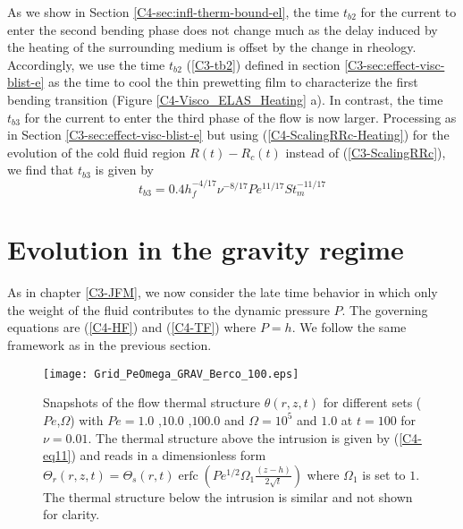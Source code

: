 As  we  show  in Section  \ref{C4-sec:infl-therm-bound-el},  the  time
$t_{b2}$ for  the current to enter  the second bending phase  does not
change much  as the delay  induced by  the heating of  the surrounding
medium is offset  by the change in rheology.  Accordingly,  we use the
time      $t_{b2}$     (\ref{C3-tb2})      defined     in      section
\ref{C3-sec:effect-visc-blist-e}  as   the  time  to  cool   the  thin
prewetting film  to characterize the first  bending transition (Figure
\ref{C4-Visco_ELAS_Heating} a). In contrast, the time $t_{b3}$ for the
current to enter the third phase of the flow is now larger. Processing
as    in    Section   \ref{C3-sec:effect-visc-blist-e}    but    using
(\ref{C4-ScalingRRc-Heating})  for the  evolution  of  the cold  fluid
region $R(t)-R_c(t)$  instead of  (\ref{C3-ScalingRRc}), we  find that
$t_{b3}$ is given by
\begin{equation}
  t_{b3}=0.4h_f^{-4/17}\nu^{-8/17}Pe^{11/17}St_m^{-11/17}
  \label{C4-tb3}
\end{equation}

\section{Evolution in the gravity regime}
\label{C4-sec:evol-grav-regime}

As in chapter \ref{C3-JFM}, we now  consider the late time behavior in
which only the weight of the fluid contributes to the dynamic pressure
$P$. The governing equations are (\ref{C4-HF}) and (\ref{C4-TF}) where
$P=h$. We follow the same framework as in the previous section.

\begin{figure}[h!]
  \begin{center}
    \graphicspath{ {/Users/thorey/Documents/These/Projet/Refroidissement/Skin_Model/Figure/Figure_Heating/} }
    \texttt{[image: Grid\_PeOmega\_GRAV\_Berco\_100.eps]}
    \caption{Snapshots of  the flow thermal  structure $\theta(r,z,t)$
      for  different  sets  ($Pe$,$\Omega$)  with  $Pe=  1.0$  ,$10.0$
      ,$100.0$   and   $\Omega=10^5$   and  $1.0$   at   $t=100$   for
      $\nu=0.01$. The  thermal structure above the  intrusion is given
      by   (\ref{C4-eq11})  and   reads   in   a  dimensionless   form
      $\Theta_r(r,z,t)=\Theta_s(r,t)\operatorname{erfc}{\left(Pe^{1/2}\Omega_1\frac{(z-h)}{2\sqrt{t}}\right)}$
      where $\Omega_1$ is set to  $1$. The thermal structure below the
      intrusion is similar and not shown for clarity.}
    \label{C4-Grid_PeOmega_Heating_GRAV}
  \end{center}
\end{figure}

